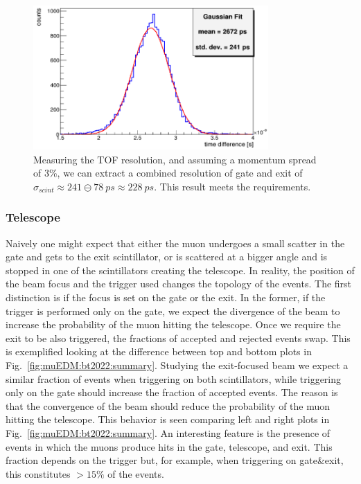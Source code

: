 \begin{refsection}
            \begin{figure}
                \centering
                \includegraphics[width = 0.8\textwidth]{Figures/muEDM_Nov2022/gate_resolution.png}
                \caption[muEDM:2022 time resolution]{Measuring the TOF resolution, and assuming a momentum spread of 3\%, we can extract a combined resolution of gate and exit of $\sigma_{scint}\approx 241 \ominus \SI{78}{ps} \approx \SI{228}{ps}$. This result meets the requirements.}
                \label{fig:muEDM:bt20212gate:resolution}
            \end{figure}

        \subsubsection{Telescope}
            \noindent
            Naively one might expect that either the muon undergoes a small scatter in the gate and gets to the exit scintillator, or is scattered at a bigger angle and is stopped in one of the scintillators creating the telescope.
            In reality, the position of the beam focus and the trigger used changes the topology of the events.
            The first distinction is if the focus is set on the gate or the exit.
            In the former, if the trigger is performed only on the gate, we expect the divergence of the beam to increase the probability of the muon hitting the telescope.
            Once we require the exit to be also triggered, the fractions of accepted and rejected events swap. 
            This is exemplified looking at the difference between top and bottom plots in Fig.~\ref{fig:muEDM:bt2022:summary}.
            Studying the exit-focused beam we expect a similar fraction of events when triggering on both scintillators, while triggering only on the gate should increase the fraction of accepted events.
            The reason is that the convergence of the beam should reduce the probability of the muon hitting the telescope.
            This behavior is seen comparing left and right plots in Fig.~\ref{fig:muEDM:bt2022:summary}.
            An interesting feature is the presence of events in which the muons produce hits in the gate, telescope, and exit. 
            This fraction depends on the trigger but, for example, when triggering on gate\&exit, this constitutes $>15\%$ of the events.\\


\end{refsection}
